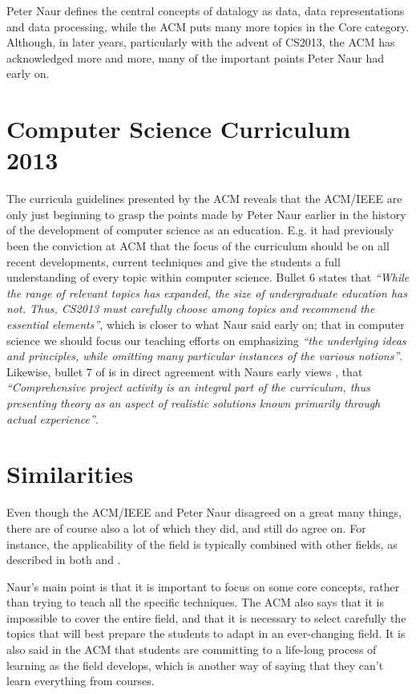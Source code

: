 \documentclass{article}
\begin{document}
Peter Naur defines the central concepts of datalogy as data, data representations and data processing, while the ACM
puts many more topics in the Core category. Although, in later years, particularly with the advent of CS2013, the ACM
has acknowledged more and more, many of the important points Peter Naur had early on.

\section{Computer Science Curriculum 2013}
The curricula guidelines presented \cite{acm13} by the ACM reveals that the ACM/IEEE are only just beginning to grasp the points
made by Peter Naur earlier in the history of the development of computer science as an education. E.g. it had previously
been the conviction at ACM that the focus of the curriculum should be on all recent developments, current techniques and
give the students a full understanding of every topic \cite{froekjaer88} within computer science. Bullet 6 states that \emph{``While the range
of relevant topics has expanded, the size of undergraduate education has not. Thus, CS2013 must carefully choose among
topics and recommend the essential elements''}, which is closer to what Naur said \cite{froekjaer88} early on; that in computer science
we should focus our teaching efforts on emphasizing \emph{``the underlying ideas and principles, while omitting many particular
instances of the various notions''}. Likewise, bullet 7 of \cite{acm13} is in direct agreement with Naurs early views \cite{froekjaer88}, that
\emph{``Comprehensive project activity is an integral part of the curriculum, thus presenting theory as an aspect of realistic
solutions known primarily through actual experience''}.

\section{Similarities}
Even though the ACM/IEEE and Peter Naur disagreed on a great many things, there are of course also a lot of which they
did, and still do agree on. For instance, the applicability of the field is typically combined with other fields, as
described in both \cite{froekjaer88} and \cite{acm13}.

Naur’s main point is that it is important to focus on some core concepts, rather than trying to teach all the specific
techniques. The ACM also says that it is impossible to cover the entire field, and that it is necessary to select
carefully the topics that will best prepare the students to adapt in an ever-changing field. It is also said in the ACM
that students are committing to a life-long process of learning as the field develops, which is another way of saying
that they can’t learn everything from courses.
\end{document}
